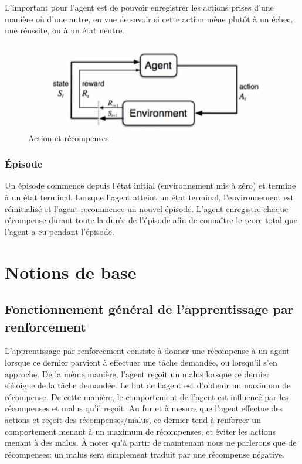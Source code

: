 \documentclass[11pt,a4paper]{report}
\begin{document}
    \par L'important pour l'agent est de pouvoir enregistrer les actions prises d'une manière où d'une autre, en vue de savoir si cette action mène plutôt à un échec, une réussite, ou à un état neutre. 
    
    \begin{figure}[!h]
    \center
    \includegraphics[scale=0.5]{ressources/shema_agent_environnement.png}
    \caption{Action et récompenses}
    \end{figure} 
    
  \subsubsection{Épisode}
  
    \par Un épisode commence depuis l'état initial (environnement mis à zéro) et termine à un état terminal. Lorsque l'agent atteint un état terminal, l'environnement est réinitialisé et l'agent recommence un nouvel épisode. L'agent enregistre chaque récompense durant toute la durée de l'épisode afin de connaître le score total que l'agent a eu pendant l'épisode.
    
  \section{Notions de base}
  
  \subsection{Fonctionnement général de l'apprentissage par renforcement}
  
    \par L'apprentissage par renforcement consiste à donner une récompense à un agent lorsque ce dernier parvient à effectuer une tâche demandée, ou lorsqu'il s'en approche. De la même manière, l'agent reçoit un malus lorsque ce dernier s'éloigne de la tâche demandée. Le but de l'agent est d'obtenir un maximum de récompense. De cette manière, le comportement de l'agent est influencé par les récompenses et malus qu'il reçoit. Au fur et à mesure que l'agent effectue des actions et reçoit des récompenses/malus, ce dernier tend à renforcer un comportement menant à un maximum de récompenses, et éviter les actions menant à des malus. À noter qu'à partir de maintenant nous ne parlerons que de récompenses: un malus sera simplement traduit par une récompense négative. 
  
\end{document}
